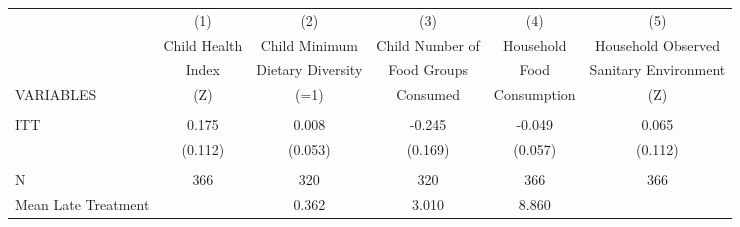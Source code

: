 \begin{tabular}{lccccc} \hline
 & (1) & (2) & (3) & (4) & (5) \\
 & Child Health & Child Minimum & Child Number of & Household & Household Observed \\
 & Index & Dietary Diversity & Food Groups & Food & Sanitary Environment \\
VARIABLES & (Z) & (=1) & Consumed & Consumption & (Z) \\ \hline
 &  &  &  &  &  \\
ITT & 0.175 & 0.008 & -0.245 & -0.049 & 0.065 \\
 & (0.112) & (0.053) & (0.169) & (0.057) & (0.112) \\
 &  &  &  &  &  \\
N & 366 & 320 & 320 & 366 & 366 \\
 Mean Late Treatment &  & 0.362 & 3.010 & 8.860 &  \\ \hline
\end{tabular}
